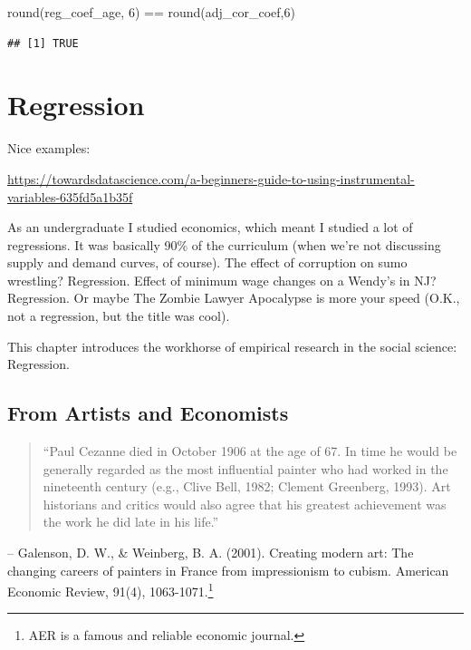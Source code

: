 \documentclass[
]{book}
\newenvironment{Shaded}{\begin{snugshade}}{\end{snugshade}}
\newcommand{\DecValTok}[1]{\textcolor[rgb]{0.00,0.00,0.81}{#1}}
\newcommand{\FunctionTok}[1]{\textcolor[rgb]{0.00,0.00,0.00}{#1}}
\newcommand{\NormalTok}[1]{#1}
\newcommand{\SpecialCharTok}[1]{\textcolor[rgb]{0.00,0.00,0.00}{#1}}
\begin{document}
\begin{Shaded}
\begin{Highlighting}[]
\FunctionTok{round}\NormalTok{(reg\_coef\_age, }\DecValTok{6}\NormalTok{) }\SpecialCharTok{==} \FunctionTok{round}\NormalTok{(adj\_cor\_coef,}\DecValTok{6}\NormalTok{)}
\end{Highlighting}
\end{Shaded}

\begin{verbatim}
## [1] TRUE
\end{verbatim}

\hypertarget{regression}{%
\chapter{Regression}\label{regression}}

Nice examples:

\url{https://towardsdatascience.com/a-beginners-guide-to-using-instrumental-variables-635fd5a1b35f}

As an undergraduate I studied economics, which meant I studied a lot of regressions. It was basically 90\% of the curriculum (when we're not discussing supply and demand curves, of course). The effect of corruption on sumo wrestling? Regression. Effect of minimum wage changes on a Wendy's in NJ? Regression. Or maybe The Zombie Lawyer Apocalypse is more your speed (O.K., not a regression, but the title was cool).

This chapter introduces the workhorse of empirical research in the social science: Regression.

\hypertarget{from-artists-and-economists}{%
\section{From Artists and Economists}\label{from-artists-and-economists}}

\begin{quote}
``Paul Cezanne died in October 1906 at the age of 67. In time he would be generally regarded as the most influential painter who had worked in the nineteenth century (e.g., Clive Bell, 1982; Clement Greenberg, 1993). Art historians and critics would also agree that his greatest achievement was the work he did late in his life.''
\end{quote}

\hfill -- Galenson, D. W., \& Weinberg, B. A. (2001). Creating modern art: The changing careers of painters in France from impressionism to cubism. American Economic Review, 91(4), 1063-1071.\footnote{AER is a famous and reliable economic journal.}
\end{document}
